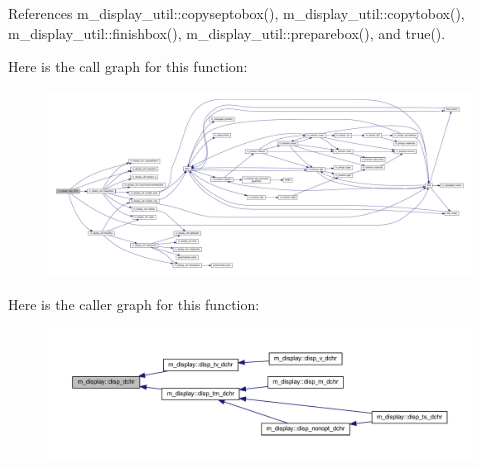 References m\+\_\+display\+\_\+util\+::copyseptobox(), m\+\_\+display\+\_\+util\+::copytobox(), m\+\_\+display\+\_\+util\+::finishbox(), m\+\_\+display\+\_\+util\+::preparebox(), and true().

Here is the call graph for this function\+:
\nopagebreak
\begin{figure}[H]
\begin{center}
\leavevmode
\includegraphics[width=350pt]{namespacem__display_a41b95f416778be093db3be49b2334570_cgraph}
\end{center}
\end{figure}
Here is the caller graph for this function\+:
\nopagebreak
\begin{figure}[H]
\begin{center}
\leavevmode
\includegraphics[width=350pt]{namespacem__display_a41b95f416778be093db3be49b2334570_icgraph}
\end{center}
\end{figure}
\mbox{\label{namespacem__display_a0e150cc23de78529e22b17b1873a9e6e}} 
